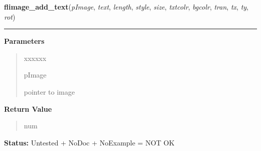 \hspace{.8\funcindent}\begin{boxedminipage}{\funcwidth}

    \raggedright \textbf{flimage\_add\_text}(\textit{pImage}, \textit{text}, \textit{length}, \textit{style}, \textit{size}, \textit{txtcolr}, \textit{bgcolr}, \textit{tran}, \textit{tx}, \textit{ty}, \textit{rot})

    \vspace{-1.5ex}

    \rule{\textwidth}{0.5\fboxrule}
\setlength{\parskip}{2ex}
\setlength{\parskip}{1ex}
      \textbf{Parameters}
      \vspace{-1ex}

      \begin{quote}
        \begin{Ventry}{xxxxxx}

          \item[pImage]

          pointer to image

        \end{Ventry}

      \end{quote}

      \textbf{Return Value}
    \vspace{-1ex}

      \begin{quote}
      num

      \end{quote}

\textbf{Status:} Untested + NoDoc + NoExample = NOT OK



    \end{boxedminipage}

    \label{xformslib:library:flimage_add_text_struct}

    \vspace{0.5ex}

